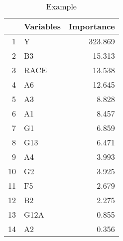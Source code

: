 \begin{table}[ht]
\centering
\begin{tabular}{rlr}
  \toprule
 & Variables & Importance \\ 
  \midrule
1 & Y & 323.869 \\ 
  2 & B3 & 15.313 \\ 
  3 & RACE & 13.538 \\ 
  4 & A6 & 12.645 \\ 
  5 & A3 & 8.828 \\ 
  6 & A1 & 8.457 \\ 
  7 & G1 & 6.859 \\ 
  8 & G13 & 6.471 \\ 
  9 & A4 & 3.993 \\ 
  10 & G2 & 3.925 \\ 
  11 & F5 & 2.679 \\ 
  12 & B2 & 2.275 \\ 
  13 & G12A & 0.855 \\ 
  14 & A2 & 0.356 \\ 
   \bottomrule
\end{tabular}
\caption{Example} 
\end{table}

